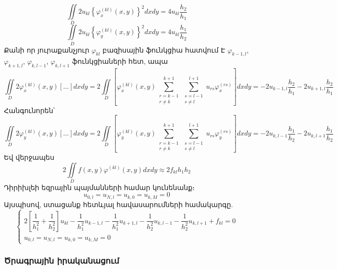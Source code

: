 \documentclass[fleqn, bachelor,subf,12pt,notitlepage]{article}
\begin{document}
\begin{equation}
\iint \limits_{D} 2u_{kl}\left\{\varphi_{x}^{(kl)}(x,y)\right\}^{2}dxdy = 4u_{kl}\dfrac{h_{2}}{h_{1}}
\end{equation}
\begin{equation}
\iint \limits_{D} 2u_{kl}\left\{\varphi_{y}^{(kl)}(x,y)\right\}^{2}dxdy = 4u_{kl}\dfrac{h_{1}}{h_{2}}
\end{equation}
Քանի որ յուրաքանչյուր $\varphi_{kl}$ բազիսային ֆունկցիա հատվում Է $\varphi_{k-1, l}$, $\varphi_{k+1, l}$, $\varphi_{k, l-1}$, $\varphi_{k, l+1}$ ֆունկցիաների հետ, ապա
\begin{equation}
\iint \limits_{D} 2\varphi_{x}^{(kl)}(x,y)[\dots]dxdy = 2\iint \limits_{D}\left[\varphi_{x}^{(kl)}(x,y)\sum_{\substack{r=k-1\\ r \neq k}}^{k+1} \sum_{\substack{s=l-1\\ s \neq l}}^{l+1} u_{rs} \varphi_{x}^{(rs)}\right]dxdy= -2u_{k-1, l}\dfrac{h_{2} }{h_{1}} -2u_{k+1, l}\dfrac{ h_{2}}{h_{1}}
\end{equation}
Հանգունորեն՝
\begin{equation}
\iint \limits_{D} 2\varphi_{y}^{(kl)}(x,y)[\dots]dxdy = 2\iint \limits_{D}\left[\varphi_{y}^{(kl)}(x,y)\sum_{\substack{r=k-1\\ r \neq k}}^{k+1} \sum_{\substack{s=l-1\\ s \neq l}}^{l+1} u_{rs} \varphi_{y}^{(rs)}\right]dxdy=-2u_{k, l-1}\dfrac{h_{1}} {h_{2}} - 2u_{k, l+1}\dfrac{h_{1}}{ h_{2}}
\end{equation}
Եվ վերջապես
\begin{equation}
2\iint \limits_{D} f(x,y)\varphi^{(kl)}(x,y)dxdy \approx 2 f_{kl} h_{1} h_{2}
\end{equation}
Դիրիխլեի եզրային պայմանների համար կունենանք։
$$u_{0, l} = u_{N, l} = u_{k, 0} = u_{k, M} = 0$$
Այսպիսով, ստացանք հետևյալ հավասարումների համակարգը.
\begin{equation}
\begin{cases}
			2\left[\dfrac{1}{h^{2}_{1}} + \dfrac{1}{h^{2}_{2}}\right] u_{kl}  -\dfrac{1}{h^{2}_{1}}u_{k-1, l} - \dfrac{1}{h^{2}_{1}}u_{k+1, l} -\dfrac{1}{h^{2}_{2}}u_{k, l-1} - \dfrac{1}{h^{2}_{2}}u_{k, l+1} + f_{kl} = 0\\
			u_{0, l} = u_{N, l} = u_{k, 0} = u_{k, M} = 0
\end{cases}
\end{equation}
\newpage
\subsubsection*{Ծրագրային իրականացում}
\end{document}
